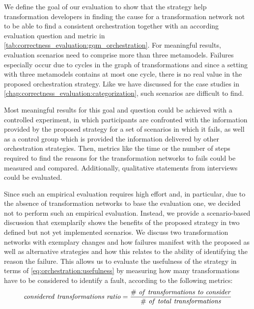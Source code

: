 We define the goal of our evaluation to show that the strategy help transformation developers in finding the cause for a transformation network not to be able to find a consistent orchestration together with an according evaluation question and metric in \autoref{tab:correctness_evaluation:gqm_orchestration}.
For meaningful results, evaluation scenarios need to comprise more than three metamodels.
Failures especially occur due to cycles in the graph of transformations and since a setting with three metamodels contains at most one cycle, there is no real value in the proposed orchestration strategy.
Like we have discussed for the case studies in \autoref{chap:correctness_evaluation:categorization}, such scenarios are difficult to find.

Most meaningful results for this goal and question could be achieved with a controlled experiment, in which participants are confronted with the information provided by the proposed strategy for a set of scenarios in which it fails, as well as a control group which is provided the information delivered by other orchestration strategies.
Then, metrics like the time or the number of steps required to find the reasons for the transformation networks to fails could be measured and compared.
Additionally, qualitative statements from interviews could be evaluated.

Since such an empirical evaluation requires high effort and, in particular, due to the absence of transformation networks to base the evaluation one, we decided not to perform such an empirical evaluation.
Instead, we provide a scenario-based discussion that exemplarily shows the benefits of the proposed strategy in two defined but not yet implemented scenarios.
We discuss two transformation networks with exemplary changes and how failures manifest with the proposed as well as alternative strategies and how this relates to the ability of identifying the reason the failure.
This allows us to evaluate the usefulness of the strategy in terms of \autoref{eq:orchestration:usefulness} by measuring how many transformations have to be considered to identify a fault, according to the following metrics:
\begin{align*}
    \mathvariable{considered\ transformations\ ratio = \frac{\#\ of\ transformations\ to\ consider%
    }{\#\ of\ total\ transformations}}
\end{align*}


